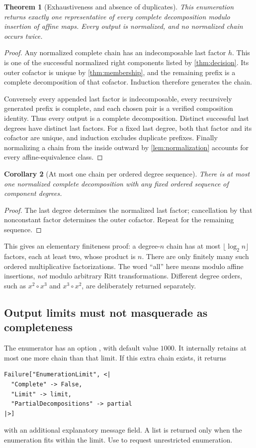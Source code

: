 \documentclass[11pt,a4paper]{article}
\newtheorem{theorem}{Theorem}[section]
\newtheorem{corollary}[theorem]{Corollary}
\theoremstyle{definition}
\newcommand{\code}[1]{\texttt{\detokenize{#1}}}
\begin{document}
\begin{theorem}[Exhaustiveness and absence of duplicates]\label{thm:all}
This enumeration returns exactly one representative of every complete decomposition modulo insertion of affine maps. Every output is normalized, and no normalized chain occurs twice.
\end{theorem}
\begin{proof}
Any normalized complete chain has an indecomposable last factor $h$. This is one of the successful normalized right components listed by \cref{thm:decision}. Its outer cofactor is unique by \cref{thm:membership}, and the remaining prefix is a complete decomposition of that cofactor. Induction therefore generates the chain.

Conversely every appended last factor is indecomposable, every recursively generated prefix is complete, and each chosen pair is a verified composition identity. Thus every output is a complete decomposition. Distinct successful last degrees have distinct last factors. For a fixed last degree, both that factor and its cofactor are unique, and induction excludes duplicate prefixes. Finally normalizing a chain from the inside outward by \cref{lem:normalization} accounts for every affine-equivalence class.
\end{proof}

\begin{corollary}[At most one chain per ordered degree sequence]\label{cor:sequence}
There is at most one normalized complete decomposition with any fixed ordered sequence of component degrees.
\end{corollary}
\begin{proof}
The last degree determines the normalized last factor; cancellation by that nonconstant factor determines the outer cofactor. Repeat for the remaining sequence.
\end{proof}

This gives an elementary finiteness proof: a degree-$n$ chain has at most $\lfloor\log_2 n\rfloor$ factors, each at least two, whose product is $n$. There are only finitely many such ordered multiplicative factorizations. The word ``all'' here means modulo affine insertions, \emph{not} modulo arbitrary Ritt transformations. Different degree orders, such as $x^2\circ x^3$ and $x^3\circ x^2$, are deliberately returned separately.

\subsection{Output limits must not masquerade as completeness}
The enumerator has an option \code{"MaxDecompositions"}, with default value $1000$. It internally retains at most one more chain than that limit. If this extra chain exists, it returns
\begin{lstlisting}
Failure["EnumerationLimit", <|
  "Complete" -> False,
  "Limit" -> limit,
  "PartialDecompositions" -> partial
|>]
\end{lstlisting}
with an additional explanatory message field. A list is returned only when the enumeration fits within the limit. Use \code{"MaxDecompositions" -> Infinity} to request unrestricted enumeration.
\end{document}
